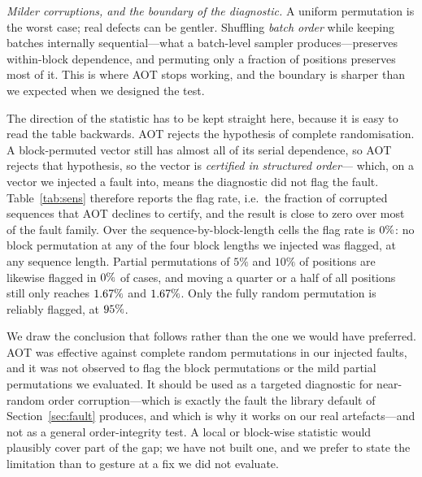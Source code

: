\documentclass[a4paper,fleqn]{cas-sc}
\newcommand{\fitwidth}[1]{%
  \resizebox{\ifdim\width>\linewidth \linewidth\else \width\fi}{!}{#1}}
\begin{document}
\emph{Milder corruptions, and the boundary of the diagnostic.} A uniform
permutation is the worst case; real defects
can be gentler. Shuffling \emph{batch order} while keeping batches internally
sequential---what a batch-level sampler produces---preserves within-block
dependence, and permuting only a fraction of positions preserves most of it. This
is where AOT stops working, and the boundary is sharper than we expected when we
designed the test.

The direction of the statistic has to be kept straight here, because it is easy to
read the table backwards. AOT rejects the hypothesis of complete randomisation. A
block-permuted vector still has almost all of its serial dependence, so AOT
rejects that hypothesis, so the vector is \emph{certified in structured order}---%
which, on a vector we injected a fault into, means the diagnostic did not flag the
fault. Table~\ref{tab:sens} therefore reports the flag rate, i.e.\ the fraction of
corrupted sequences that AOT declines to certify, and the result is
close to zero over most of the fault family. Over the \NumSensNBlockRows{}
sequence-by-block-length cells the flag rate is $0\%$: no block
permutation at any of the four block lengths we injected was flagged, at any
sequence length. Partial permutations of $5\%$ and $10\%$ of positions are likewise
flagged in $0\%$ of cases, and moving a quarter or a half
of all positions still only reaches $1.67\%$ and
$1.67\%$. Only the fully random permutation is reliably flagged,
at $95\%$.

We draw the conclusion that follows rather than the one we would have preferred.
AOT was effective against complete random permutations in our injected faults, and
it was not observed to flag the block permutations or the mild partial permutations
we evaluated. It should be used as a targeted diagnostic for near-random order
corruption---which is exactly the fault the library default of
Section~\ref{sec:fault} produces, and which is why it works on our real
artefacts---and not as a general order-integrity test. A local or block-wise
statistic would plausibly cover part of the gap; we have not built one, and we
prefer to state the limitation than to gesture at a fix we did not evaluate.

\begin{table}[t]
\centering
\caption{Where AOT stops working. Each row is one injected corruption family;
\emph{flagged} is the fraction of corrupted sequences that AOT declines to certify,
i.e.\ the detection rate. Block permutations and mild partial permutations retain
enough serial dependence that the complete-randomisation null is still rejected, so
they are certified and the fault is not flagged. Generated from
\texttt{artifacts/aot\_sensitivity.csv}.}
\label{tab:sens}
\fitwidth{}
\end{table}
\end{document}
